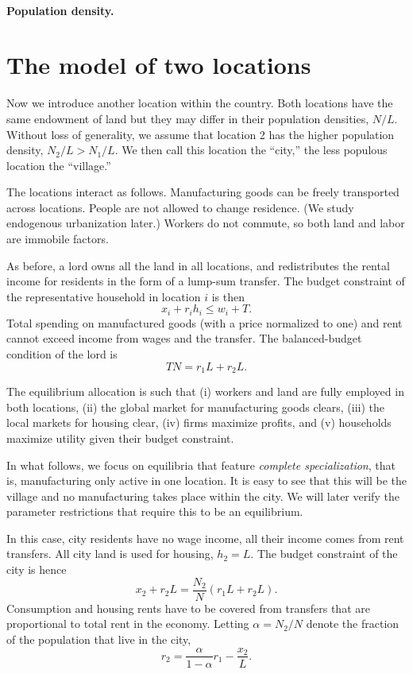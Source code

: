 \documentclass[12pt]{article}
\begin{document}
\paragraph{Population density.}

\section{The model of two locations}
Now we introduce another location within the country. Both  locations have the same endowment of land but they may differ in their population densities, $N/L$. Without loss of generality, we assume that location 2 has the higher population density, $N_2/L>N_1/L$. We then call this location the ``city,'' the less populous location the ``village.''

The locations interact as follows. Manufacturing goods can be freely transported across locations. People are not allowed to change residence. (We study endogenous urbanization later.) Workers do not commute, so both land and labor are immobile factors.

As before, a lord owns all the land in all locations, and redistributes the rental income for residents in the form of a lump-sum transfer. The budget constraint of the representative household in location $i$ is then
\[
x_i + r_i h_i \le w_i + T.
\]
Total spending on manufactured goods (with a price normalized to one) and rent cannot exceed income from wages and the transfer. The balanced-budget condition of the lord is
\[
TN = r_1L+r_2L.
\]

The equilibrium allocation is such that (i) workers and land are fully employed in both locations, (ii) the global market for manufacturing goods clears, (iii) the local markets for housing clear, (iv) firms maximize profits, and (v) households maximize utility given their budget constraint.

In what follows, we focus on equilibria that feature \emph{complete specialization}, that is, manufacturing only active in one location. It is easy to see that this will be the village and no manufacturing takes place within the city. We will later verify the parameter restrictions that require this to be an equilibrium.

In this case, city residents have no wage income, all their income comes from rent transfers. All city land is used for housing, $h_2=L$. The budget constraint of the city is hence
\[
x_2+r_2L = \frac{N_2}{N}(r_1L+r_2L).
\]
Consumption and housing rents have to be covered from transfers that are proportional to total rent in the economy. Letting $\alpha=N_2/N$ denote the fraction of the population that live in the city,
\[
r_2 = \frac{\alpha}{1-\alpha}r_1 -\frac{x_2}{L}.
\]
\end{document}
